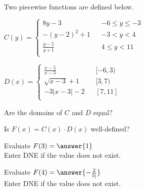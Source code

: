 \documentclass{ximera}
\begin{document}
\begin{definition}
Two piecewise functions are defined below.

$C(y) =   
\left \{ \begin{aligned}     
8 y - 3 && -6 \leq y \leq -3 \\        
-(y-2)^2 + 1 && -3 < y < 4 \\      
\frac{y-5}{y+1} && 4 \leq y < 11\\       
\end{aligned} \right .$ 




$D(x) =   
\left \{ \begin{aligned}     
\frac{x-5}{x-3} && [-6, 3) \\        
\sqrt{x-3} + 1 && [3, 7) \\      
-3|x-3|-2 && [7, 11]\\       
\end{aligned} \right .$ 


\end{definition}





\begin{exercise}
Are the domains of $C$ and $D$ equal?

\begin{multipleChoice}
\end{multipleChoice}

\end{exercise}


\begin{exercise}
Is $F(x) = C(x) \cdot D(x)$ well-defined?

\begin{multipleChoice}
\end{multipleChoice}

\end{exercise}





\begin{exercise}

Evaluate $F(3) = \answer{1}$ \\
Enter DNE if the value does not exist.

\end{exercise}



\begin{exercise}

Evaluate $F(4) = \answer{-\frac{2}{5]}}$ \\
Enter DNE if the value does not exist.

\end{exercise}
\end{document}
